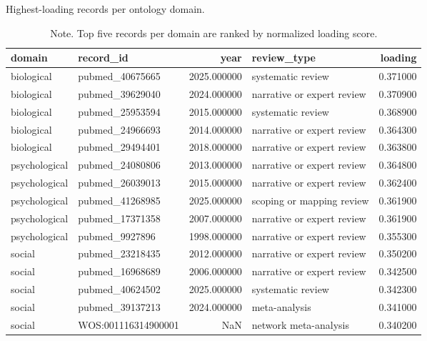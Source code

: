 \begin{table}[htbp]
\raggedright
\caption{Highest-loading records per ontology domain.}
\label{tab.semantic.top.records}
\begin{tabular}{llrlr}
\toprule
domain & record\_id & year & review\_type & loading \\
\midrule
biological & pubmed\_40675665 & 2025.000000 & systematic review & 0.371000 \\
biological & pubmed\_39629040 & 2024.000000 & narrative or expert review & 0.370900 \\
biological & pubmed\_25953594 & 2015.000000 & systematic review & 0.368900 \\
biological & pubmed\_24966693 & 2014.000000 & narrative or expert review & 0.364300 \\
biological & pubmed\_29494401 & 2018.000000 & narrative or expert review & 0.363800 \\
psychological & pubmed\_24080806 & 2013.000000 & narrative or expert review & 0.364800 \\
psychological & pubmed\_26039013 & 2015.000000 & narrative or expert review & 0.362400 \\
psychological & pubmed\_41268985 & 2025.000000 & scoping or mapping review & 0.361900 \\
psychological & pubmed\_17371358 & 2007.000000 & narrative or expert review & 0.361900 \\
psychological & pubmed\_9927896 & 1998.000000 & narrative or expert review & 0.355300 \\
social & pubmed\_23218435 & 2012.000000 & narrative or expert review & 0.350200 \\
social & pubmed\_16968689 & 2006.000000 & narrative or expert review & 0.342500 \\
social & pubmed\_40624502 & 2025.000000 & systematic review & 0.342300 \\
social & pubmed\_39137213 & 2024.000000 & meta-analysis & 0.341000 \\
social & WOS:001116314900001 & NaN & network meta-analysis & 0.340200 \\
\bottomrule
\end{tabular}

\caption*{Note. Top five records per domain are ranked by normalized loading score.}
\end{table}
